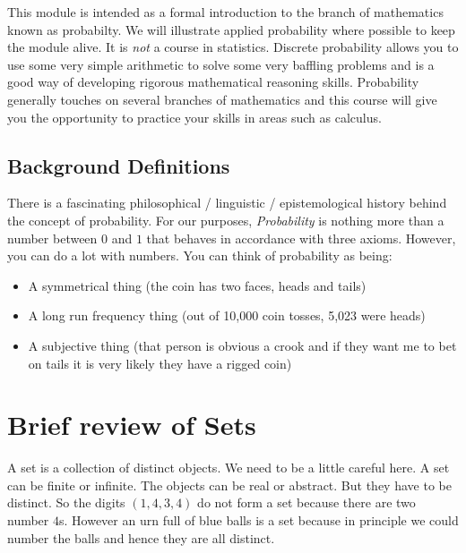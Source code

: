 \documentclass[12pt]{extbook}
\begin{document}
This module is intended as a formal introduction to the branch of mathematics known as probabilty.   We will illustrate applied probability where possible to keep the module alive.   It is \emph{not} a course in statistics.   Discrete probability allows you to use some very simple arithmetic to solve some very baffling problems and is a good way of developing rigorous mathematical reasoning skills.   Probability generally touches on several branches of mathematics and this course will give you the opportunity to practice your skills in areas such as calculus.

\section{Background Definitions}

There is a fascinating philosophical / linguistic / epistemological history behind the concept of probability.   For our purposes, \emph{Probability} is nothing more than a number between $0$ and $1$ that behaves in accordance with three axioms.   However, you can do a lot with numbers.   You can think of probability as being:

\begin{itemize}
\item A symmetrical thing (the coin has two faces, heads and tails)
\item A long run frequency thing (out of 10,000 coin tosses, 5,023 were heads)
\item A subjective thing (that person is obvious a crook and if they want me to bet on tails it is very likely they have a rigged coin)
\end{itemize}







\chapter{Brief review of Sets}

A set is a collection of distinct objects.   We need to be a little careful here.   A set can be finite or infinite.   The objects can be real or abstract.   But they have to be distinct.   So the digits $(1,4,3,4)$ do not form a set because there are two number $4$s.   However an urn full of blue balls is a set because in principle we could number the balls and hence they are all distinct.
\end{document}
